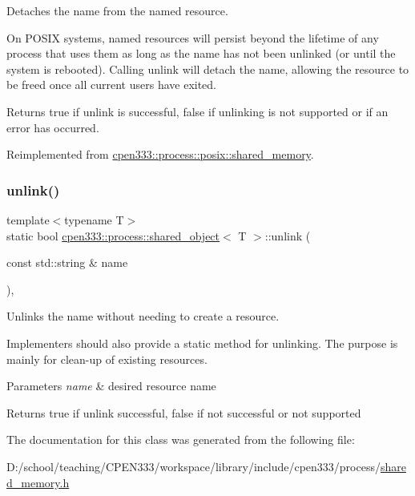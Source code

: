 Detaches the name from the named resource. 

On P\+O\+S\+IX systems, named resources will persist beyond the lifetime of any process that uses them as long as the name has not been unlinked (or until the system is rebooted). Calling {\ttfamily unlink} will detach the name, allowing the resource to be freed once all current users have exited.

\begin{DoxyReturn}{Returns}
{\ttfamily true} if unlink is successful, {\ttfamily false} if unlinking is not supported or if an error has occurred. 
\end{DoxyReturn}


Reimplemented from \hyperlink{classcpen333_1_1process_1_1posix_1_1shared__memory_a3b6d67a41cfaca3712d87958682d8bbe}{cpen333\+::process\+::posix\+::shared\+\_\+memory}.

\mbox{\label{classcpen333_1_1process_1_1shared__object_a478c2228031b8471b1e729ce78aabd97}} 
\subsubsection{\texorpdfstring{unlink()}{unlink()}\hspace{0.1cm}{\footnotesize\ttfamily [2/2]}}
{\footnotesize\ttfamily template$<$typename T$>$ \\
static bool \hyperlink{classcpen333_1_1process_1_1shared__object}{cpen333\+::process\+::shared\+\_\+object}$<$ T $>$\+::unlink (\begin{DoxyParamCaption}\item[{const std\+::string \&}]{name }\end{DoxyParamCaption})\hspace{0.3cm}{\ttfamily [inline]}, {\ttfamily [static]}}



Unlinks the name without needing to create a resource. 

Implementers should also provide a static method for unlinking. The purpose is mainly for clean-\/up of existing resources.


\begin{DoxyParams}{Parameters}
{\em name} & desired resource name \\
\hline
\end{DoxyParams}
\begin{DoxyReturn}{Returns}
{\ttfamily true} if unlink successful, {\ttfamily false} if not successful or not supported 
\end{DoxyReturn}


The documentation for this class was generated from the following file\+:\begin{DoxyCompactItemize}
\item 
D\+:/school/teaching/\+C\+P\+E\+N333/workspace/library/include/cpen333/process/\hyperlink{shared__memory_8h}{shared\+\_\+memory.\+h}\end{DoxyCompactItemize}
